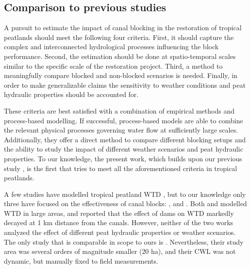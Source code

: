 \documentclass[bg, manuscript]{copernicus}
\begin{document}
\subsection{Comparison to previous studies}
A pursuit to estimate the impact of canal blocking in the restoration of tropical peatlands should meet the following four criteria.
First, it should capture the complex and interconnected hydrological processes influencing the block performance.
Second, the estimation should be done at spatio-temporal scales similar to the specific scale of the  restoration project.
Third, a method to meaningfully compare blocked and non-blocked scenarios is needed.
Finally, in order to make generalizable claims the sensitivity to weather conditions and peat hydraulic properties should be accounted for.

These criteria are best satisfied with a combination of empirical methods and process-based modelling.
If successful, process-based models are  able to combine the relevant  physical processes governing water flow at sufficiently large scales.
Additionally, they offer a direct method to compare different blocking setups and the ability to study the impact of different weather scenarios and peat hydraulic properties.
To our knowledge, the present work, which builds upon our previous study \citep{urzainkiCanalBlockingOptimization2020}, is the first that tries to meet all the aforementioned criteria in tropical peatlands.

A few studies have modelled tropical peatland WTD \citep{cobbHowTemporalPatterns2017, cobbScalarSimulationParameterization2019, bairdDigiBogPeatlandDevelopment2012, bairdHighPermeabilityExplains2017, morrisDigiBogPeatlandDevelopment2012, wostenTropicalPeatlandWater2006}, but to our knowledge only three have focused on the effectiveness of canal blocks: \cite{jaenickePlanningHydrologicalRestoration2010}, \cite{ishiiGroundwaterPeatland2016} and \cite{putraModellingPerformanceBunds2022}.
Both \cite{jaenickePlanningHydrologicalRestoration2010} and \cite{ishiiGroundwaterPeatland2016} modelled WTD in large areas, and reported that the  effect of dams on  WTD markedly decayed at 1 \unit{km} distance from the canals.
However, neither of the two works analyzed the effect of different  peat hydraulic properties or weather scenarios.
The only study that is comparable in scope to ours is \cite{putraModellingPerformanceBunds2022}.
Nevertheless, their study area was several orders of magnitude smaller ($20$ \unit{ha}), and their CWL was not dynamic, but manually fixed to field measurements.
\end{document}
